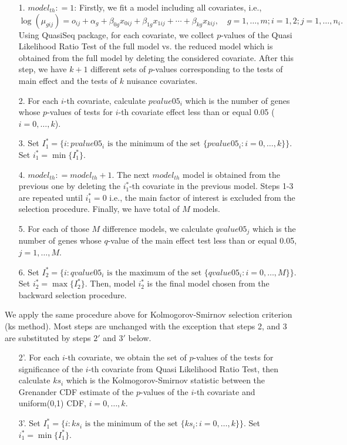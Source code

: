 \documentclass[12pt, letter]{article}\usepackage[]{graphicx}\usepackage[]{color}
\begin{document}
\begin{itemize}
\item[1.] $model_{th}: =1$: Firstly, we fit a model including all covariates, i.e.,
\[
\log(\mu_{gij}) = o_{ij} +\alpha_{g} +  \beta_{0g}x_{0ij} + \beta_{1g}x_{1ij} + \cdots + \beta_{kg}x_{kij}, \quad g = 1, \dots, m; i = 1, 2; j = 1, \dots, n_i.
\]
Using QuasiSeq package, for each covariate, we collect $p$-values of the Quasi Likelihood Ratio Test of the full model vs. the reduced model which is obtained from the full model by deleting the considered covariate. After this step, we have $k+1$ different sets of $p$-values corresponding to the tests of main effect and the tests of $k$ nuisance covariates. 

\item[2.] For each $i$-th  covariate, calculate $pvalue05_i$ which is the number of genes whose $p$-values of tests for $i$-th covariate effect less than or equal 0.05 ($i = 0,\dots, k$). 

\item[3.] Set $I_1^* = \{i: pvalue05_i \mbox{ is the minimum of the set }\{pvalue05_i: i = 0, \dots, k\}\}$. Set $i_1^* = \min\{I_1^*\}$. 

\item[4.] $model_{th}: = model_{th} +1$. The next $model_{th}$ model is obtained from the previous one by deleting the $i_1^*$-th covariate in the previous model. Steps 1-3 are repeated  until $i_1^* = 0$ i.e., the main factor of interest is excluded from the selection procedure. Finally, we have total of $M$ models.

\item[5.] For each of those $M$ difference models, we calculate $qvalue05_j$ which is the number of genes whose $q$-value of the main effect test less than or equal 0.05, $ j = 1, \dots, M$. 

\item[6.]  Set $I_2^* = \{i: qvalue05_i \mbox{ is the maximum of the set }\{qvalue05_i: i = 0, \dots, M\}\}$. Set $i_2^* = \max\{I_2^*\}$. Then, model $i_2^*$ is the final model chosen from the backward selection procedure. 
\end{itemize}

We apply the same procedure  above for Kolmogorov-Smirnov selection criterion (ks method). Most steps  are unchanged with the exception that steps 2, and 3 are substituted by steps $2'$ and $3'$ below.
\begin{itemize}
\item[2'.] For each $i$-th covariate, we obtain the set of $p$-values of the tests for significance of the $i$-th covariate from Quasi Likelihood Ratio Test, then calculate $ks_i$ which is the Kolmogorov-Smirnov statistic between the Grenander CDF estimate of the $p$-values of the $i$-th covariate
and uniform(0,1) CDF, $ i = 0, \dots, k$. 

\item[3'.] Set $I_1^* = \{i: ks_i \mbox{ is the minimum of the set }\{ks_i: i = 0, \dots, k\}\}$. Set $i_1^* = \min\{I_1^*\}$. 
\end{itemize}
\end{document}
